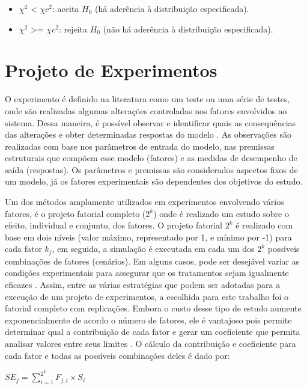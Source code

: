 \documentclass[pt,disc,oneside]{ufscpgeasthesis}
\begin{document}
			\begin{itemize}
				\item{$\chi^2$ < $\chi c^2$:} aceita $H_0$ (há aderência à distribuição especificada).
				\item{$\chi^2$ >= $\chi c^2$:} rejeita $H_0$ (não há aderência à distribuição especificada).
			\end{itemize}

		\section{Projeto de Experimentos}
		\label{sec:projeto}

			O experimento é definido na literatura como um teste ou uma série de testes, onde são realizadas algumas alterações controladas nos fatores envolvidos no sistema.
			Dessa maneira, é possível observar e identificar quais as consequências das alterações e obter determinadas respostas do modelo \cite{Montgomery}.
			As observações são realizadas com base nos parâmetros de entrada do modelo, nas premissas estruturais que compõem esse modelo (fatores) e as medidas de desempenho de saída (respostas).
			Os parâmetros e premissas são considerados aspectos fixos de um modelo, já os fatores experimentais são dependentes dos objetivos do estudo.

			Um dos métodos amplamente utilizados em experimentos envolvendo vários fatores, é o projeto fatorial completo ($2^k$) onde é realizado um estudo sobre o efeito, individual e conjunto, dos fatores.
			O projeto fatorial $2^k$ é realizado com base em dois níveis (valor máximo, representado por 1, e mínimo por -1) para cada fator $k_j$, em seguida, a simulação é executada em cada um dos $2^k$ possíveis combinações de fatores (cenários).
			Em alguns casos, pode ser desejável variar as condições experimentais para assegurar que os tratamentos sejam igualmente eficazes \cite{Montgomery}.
			Assim, entre as várias estratégias que podem ser adotadas para a execução de um projeto de experimentos, a escolhida para este trabalho foi o fatorial completo com replicações.
			Embora o custo desse tipo de estudo aumente exponencialmente de acordo o número de fatores, ele é vantajoso pois permite determinar qual a contribuição de cada fator e gerar um coeficiente que permita analisar valores entre seus limites \cite{Distribuicoes}.
			O cálculo da contribuição e coeficiente para cada fator e todas as possíveis combinações deles é dado por:

			\begin{center}
				\LARGE{$SE_j = \sum_{i=1}^{2^k} F_{j,i} \times S_i$}
			\end{center}
\end{document}
